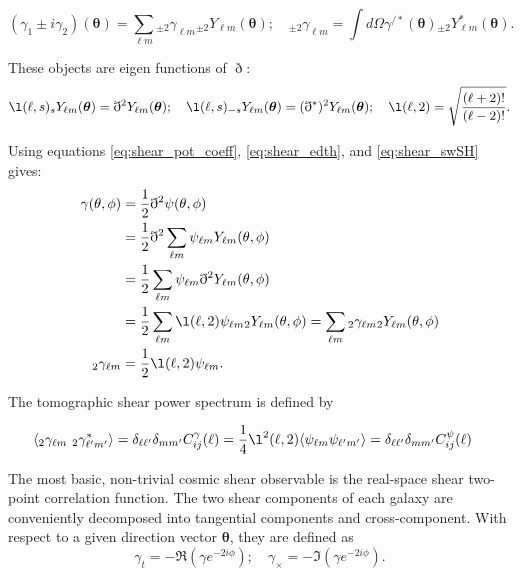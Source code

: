 \begin{equation}
    \label{eq:shear_swSH}
    (\gamma_1 \pm i\gamma_2)(\bm{\theta}) = \sum_{\ell m} {}_{\pm2}\gamma_{\ell m} {}_{\pm2}Y_{\ell m}(\bm{\theta}); \quad _{\pm2}\gamma_{\ell m} = \int d\Omega \gamma^{/*}(\bm{\theta}) {}_{\pm2}Y^*_{\ell m}(\bm{\theta}).
\end{equation}

These objects are eigen functions of $\eth$:
\begin{equation}
    \label{eq:shear_eigen}
    \l(\ell, s){}_{s}Y_{\ell m}(\bm{\theta}) = \eth^2 Y_{\ell m}(\bm{\theta}); \quad \l(\ell, s){}_{-s}Y_{\ell m}(\bm{\theta}) = (\eth^*)^2 Y_{\ell m}(\bm{\theta}); \quad \l(\ell, 2) = \sqrt{\frac{(\ell+2)!}{(\ell-2)!}}.
\end{equation}

Using equations \ref{eq:shear_pot_coeff}, \ref{eq:shear_edth}, and \ref{eq:shear_swSH} gives:
\begin{align}
    \label{eq:shear_shearpot}
    \nonumber \gamma(\theta, \phi) &= \frac{1}{2}\eth^2\psi(\theta, \phi) \\
    \nonumber &= \frac{1}{2}\eth^2 \sum_{\ell m}\psi_{\ell m} Y_{\ell m}(\theta, \phi)\\
    \nonumber &= \frac{1}{2}\sum_{\ell m}\psi_{\ell m} \eth^2  Y_{\ell m}(\theta, \phi) \\ 
    \nonumber &= \frac{1}{2}\sum_{\ell m}\l(\ell, 2) \psi_{\ell m}  {}_{2} Y_{\ell m}(\theta, \phi) = \sum_{\ell m} {}_2\gamma_{\ell m} {}_2 Y_{\ell m}(\theta, \phi) \\
    {}_2\gamma_{\ell m} &= \frac{1}{2} \l(\ell, 2)\psi_{\ell m}.
\end{align}

The tomographic shear power spectrum is defined by

\begin{align}
    \label{eq:shear_shearps}
    \langle{}_2\gamma_{\ell m}~{}_2\gamma^*_{\ell' m'}\rangle &= \delta_{\ell \ell'}\delta_{m m'} C^\gamma_{ij}(\ell)=\frac{1}{4}\l^2(\ell, 2)\langle\psi_{\ell m}\psi_{\ell' m'}\rangle = \delta_{\ell \ell'}\delta_{m m'} C^\psi_{ij}(\ell)
\end{align}


The most basic, non-trivial cosmic shear observable is the real-space shear two-point correlation function. The two shear components of each galaxy are conveniently decomposed into tangential components and cross-component. With respect to a given direction vector $\bm{\theta}$, they are defined as
\begin{equation}
    \label{eq:shear_tancross}
    \gamma_t = -\Re(\gamma e^{-2i\phi}); \quad \gamma_\times = -\Im(\gamma e^{-2i\phi}).
\end{equation}